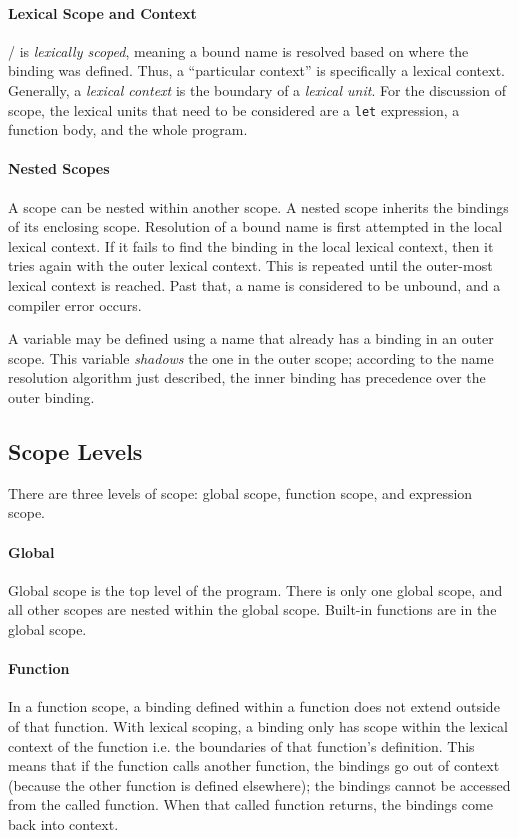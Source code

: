 \documentclass[a4paper, 12pt]{article}
\begin{document}
\paragraph{Lexical Scope and Context}
\lispy/ is \textit{lexically scoped}, meaning a bound name is resolved based on where the binding was defined. Thus, a ``particular context'' is specifically a lexical context. Generally, a \textit{lexical context} is the boundary of a \textit{lexical unit}. For the discussion of scope, the lexical units that need to be considered are a \texttt{let} expression, a function body, and the whole program.

\paragraph{Nested Scopes}
A scope can be nested within another scope. A nested scope inherits the bindings of its enclosing scope. Resolution of a bound name is first attempted in the local lexical context. If it fails to find the binding in the local lexical context, then it tries again with the outer lexical context. This is repeated until the outer-most lexical context is reached. Past that, a name is considered to be unbound, and a compiler error occurs.

A variable may be defined using a name that already has a binding in an outer scope. This variable \textit{shadows} the one in the outer scope; according to the name resolution algorithm just described, the inner binding has precedence over the outer binding.

\subsection{Scope Levels}
There are three levels of scope: global scope, function scope, and expression scope.

\paragraph{Global}
Global scope is the top level of the program. There is only one global scope, and all other scopes are nested within the global scope. Built-in functions are in the global scope.

\paragraph{Function}
In a function scope, a binding defined within a function does not extend outside of that function. With lexical scoping, a binding only has scope within the lexical context of the function i.e. the boundaries of that function's definition. This means that if the function calls another function, the bindings go out of context (because the other function is defined elsewhere); the bindings cannot be accessed from the called function. When that called function returns, the bindings come back into context.
\end{document}
